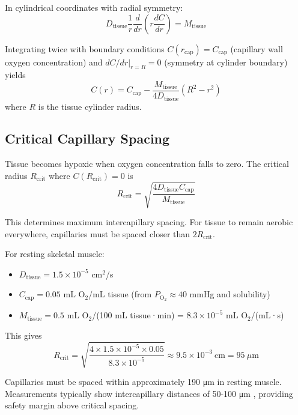 \documentclass[10pt,twocolumn,a4paper]{article}
\theoremstyle{remark}
\begin{document}
In cylindrical coordinates with radial symmetry:
\begin{equation}
D_{\mathrm{tissue}} \frac{1}{r} \frac{d}{dr}\left(r \frac{dC}{dr}\right) = M_{\mathrm{tissue}}
\end{equation}

Integrating twice with boundary conditions $C(r_{\mathrm{cap}}) = C_{\mathrm{cap}}$ (capillary wall oxygen concentration) and $dC/dr|_{r=R} = 0$ (symmetry at cylinder boundary) yields
\begin{equation}
C(r) = C_{\mathrm{cap}} - \frac{M_{\mathrm{tissue}}}{4D_{\mathrm{tissue}}}(R^{2} - r^{2})
\label{eq:krogh}
\end{equation}
where $R$ is the tissue cylinder radius.

\subsection{Critical Capillary Spacing}

Tissue becomes hypoxic when oxygen concentration falls to zero. The critical radius $R_{\mathrm{crit}}$ where $C(R_{\mathrm{crit}}) = 0$ is
\begin{equation}
R_{\mathrm{crit}} = \sqrt{\frac{4D_{\mathrm{tissue}} C_{\mathrm{cap}}}{M_{\mathrm{tissue}}}}
\end{equation}

This determines maximum intercapillary spacing. For tissue to remain aerobic everywhere, capillaries must be spaced closer than $2R_{\mathrm{crit}}$.

For resting skeletal muscle:
\begin{itemize}
\item $D_{\mathrm{tissue}} = 1.5 \times 10^{-5}$ cm$^{2}$/s
\item $C_{\mathrm{cap}} = 0.05$ mL O$_{2}$/mL tissue (from $P_{\mathrm{O}_{2}} \approx 40$ mmHg and solubility)
\item $M_{\mathrm{tissue}} = 0.5$ mL O$_{2}$/(100 mL tissue·min) = $8.3 \times 10^{-5}$ mL O$_{2}$/(mL·s)
\end{itemize}

This gives
\begin{equation}
R_{\mathrm{crit}} = \sqrt{\frac{4 \times 1.5 \times 10^{-5} \times 0.05}{8.3 \times 10^{-5}}} \approx 9.5 \times 10^{-3}~\mathrm{cm} = 95~\mu\mathrm{m}
\end{equation}

Capillaries must be spaced within approximately 190 μm in resting muscle. Measurements typically show intercapillary distances of 50-100 μm \cite{hudlicka1992muscle}, providing safety margin above critical spacing.
\end{document}
